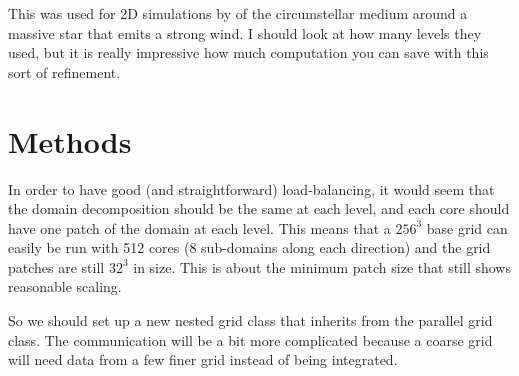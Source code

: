 \documentclass[a4paper,11pt]{article}
\begin{document}
This was used for 2D simulations by \citet{FreHenYor03, FreHenYor06} of the circumstellar medium around a massive star that emits a strong wind.
I should look at how many levels they used, but it is really impressive how much computation you can save with this sort of refinement.

\section{Methods}
In order to have good (and straightforward) load-balancing, it would seem that the domain decomposition should be the same at each level, and each core should have one patch of the domain at each level.
This means that a $256^3$ base grid can easily be run with 512 cores (8 sub-domains along each direction) and the grid patches are still $32^3$ in size.
This is about the minimum patch size that still shows reasonable scaling.

So we should set up a new nested grid class that inherits from the parallel grid class.
The communication will be a bit more complicated because a coarse grid will need data from a few finer grid instead of being integrated.










\end{document}
